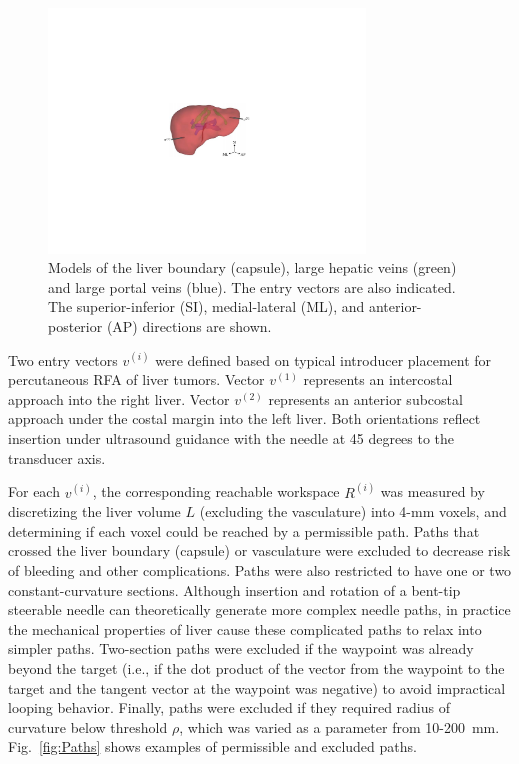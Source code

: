 \begin{figure}[!t]
\centering
\includegraphics[width = 0.75\textwidth]{Images/Chapter3/Meshes3D/Meshes3D}%
\caption[Models of the liver anatomy]{Models of the liver boundary (capsule), large hepatic veins (green) and large portal veins (blue). The entry vectors are also indicated. The superior-inferior (SI), medial-lateral (ML), and anterior-posterior (AP) directions are shown.}
\label{fig:Meshes3D}
\end{figure}

Two entry vectors $v^{(i)}$ were defined based on typical introducer placement for percutaneous RFA of liver tumors. Vector $v^{(1)}$ represents an intercostal approach into the right liver. Vector $v^{(2)}$ represents an anterior subcostal approach under the costal margin into the left liver. Both orientations reflect insertion under ultrasound guidance with the needle at 45 degrees to the transducer axis. 

For each $v^{(i)}$, the corresponding reachable workspace $R^{(i)}$ was measured by discretizing the liver volume $L$ (excluding the vasculature) into 4-mm voxels, and determining if each voxel could be reached by a permissible path. Paths that crossed the liver boundary (capsule) or vasculature were excluded to decrease risk of bleeding and other complications. Paths were also restricted to have one or two constant-curvature sections. Although insertion and rotation of a bent-tip steerable needle can theoretically generate more complex needle paths, in practice the mechanical properties of liver cause these complicated paths to relax into simpler paths. Two-section paths were excluded if the waypoint was already beyond the target (i.e., if the dot product of the vector from the waypoint to the target and the tangent vector at the waypoint was negative) to avoid impractical looping behavior. Finally, paths were excluded if they required radius of curvature below threshold $\rho$, which was varied as a parameter from 10-200~mm. Fig.~\ref{fig:Paths} shows examples of permissible and excluded paths. 


